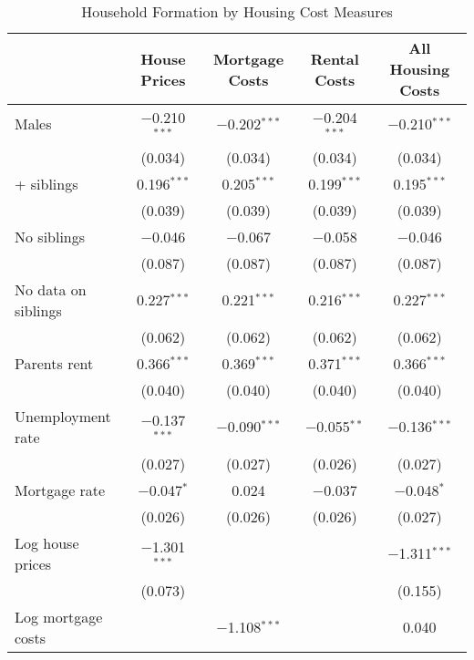 
\begin{table}[!htbp] \centering 
  \begin{threeparttable}
  \caption{Household Formation by Housing Cost Measures} 
  \label{house-cost-res} 
\begin{tabular}{@{\extracolsep{1pt}}lcccc} 
\toprule
\parbox[t]{0.24\textwidth}{\centering } & \parbox[t]{0.16\textwidth}{\centering House Prices} & \parbox[t]{0.16\textwidth}{\centering Mortgage Costs} & \parbox[t]{0.16\textwidth}{\centering Rental Costs} & \parbox[t]{0.16\textwidth}{\centering All Housing Costs} \\
\midrule
 Males & $-$0.210$^{***}$ & $-$0.202$^{***}$ & $-$0.204$^{***}$ & $-$0.210$^{***}$ \\ 
  & (0.034) & (0.034) & (0.034) & (0.034) \\ 
+ siblings & 0.196$^{***}$ & 0.205$^{***}$ & 0.199$^{***}$ & 0.195$^{***}$ \\ 
  & (0.039) & (0.039) & (0.039) & (0.039) \\ 
\addlinespace[0.5em]
 No siblings & $-$0.046 & $-$0.067 & $-$0.058 & $-$0.046 \\ 
  & (0.087) & (0.087) & (0.087) & (0.087) \\ 
\addlinespace[0.5em]
 No data on siblings & 0.227$^{***}$ & 0.221$^{***}$ & 0.216$^{***}$ & 0.227$^{***}$ \\ 
  & (0.062) & (0.062) & (0.062) & (0.062) \\ 
\addlinespace[0.5em]
 Parents rent & 0.366$^{***}$ & 0.369$^{***}$ & 0.371$^{***}$ & 0.366$^{***}$ \\ 
  & (0.040) & (0.040) & (0.040) & (0.040) \\ 
\addlinespace[0.5em]
 Unemployment rate & $-$0.137$^{***}$ & $-$0.090$^{***}$ & $-$0.055$^{**}$ & $-$0.136$^{***}$ \\ 
  & (0.027) & (0.027) & (0.026) & (0.027) \\ 
\addlinespace[0.5em]
 Mortgage rate & $-$0.047$^{*}$ & 0.024 & $-$0.037 & $-$0.048$^{*}$ \\ 
  & (0.026) & (0.026) & (0.026) & (0.027) \\ 
\addlinespace[0.5em]
 Log house prices & $-$1.301$^{***}$ &  &  & $-$1.311$^{***}$ \\ 
  & (0.073) &  &  & (0.155) \\ 
\addlinespace[0.5em]
 Log mortgage costs &  & $-$1.108$^{***}$ &  & 0.040 \\ 

\end{tabular}
\end{threeparttable}
\end{table}
